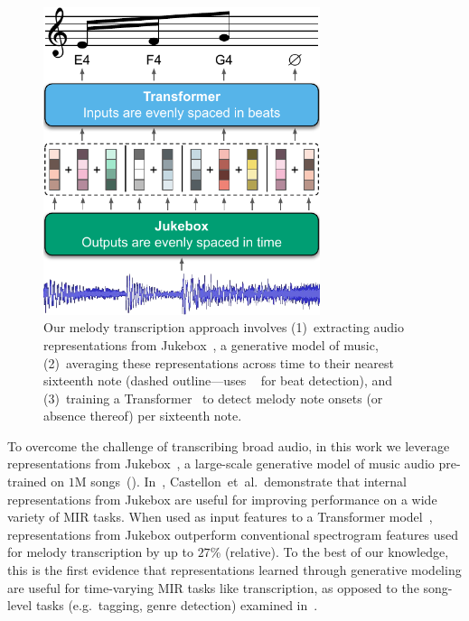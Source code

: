 \begin{figure}
    \centering
    \includegraphics[width=8.1cm]{figs/fig1.pdf}
    \caption{
Our melody transcription approach involves 
(1)~extracting audio representations from Jukebox~\cite{dhariwal2020jukebox}, a generative model of music, 
(2)~averaging these representations across time to their nearest sixteenth note (dashed outline---uses \madmom{}~\cite{bock2016joint,bock2016madmom} for beat detection),
and
(3)~training a Transformer~\cite{vaswani2017attention} to detect melody note onsets (or absence thereof) per sixteenth note. 
}
 \label{fig:fig1}
\end{figure}

To overcome the challenge of transcribing broad audio, in this work we leverage representations from Jukebox~\cite{dhariwal2020jukebox}, a large-scale generative model of music audio pre-trained on $1$M songs~(). 
In~\cite{castellon2021calm}, Castellon~et~al.\ demonstrate that internal representations from Jukebox are useful for improving performance on a wide variety of MIR tasks. 
When used as input features to a Transformer model~\cite{vaswani2017attention}, representations from Jukebox outperform conventional spectrogram features used for melody transcription by 
up to $27$\% (relative). 
To the best of our knowledge, this is the first evidence that representations learned through generative modeling are useful for time-varying MIR tasks like transcription, as opposed to the song-level tasks (e.g.~tagging, genre detection) examined in~\cite{castellon2021calm}.

